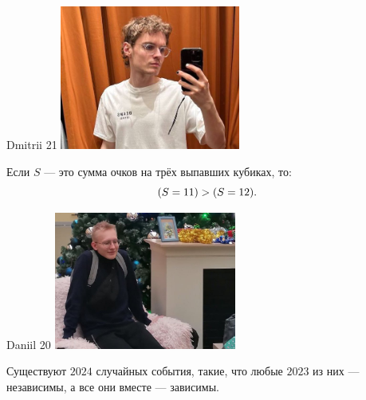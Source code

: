 \documentclass[12pt]{article}
\let\P\relax
\DeclareMathOperator{\P}{\mathbb{P}}
\begin{document}
\begin{minipage}{0.45\textwidth}
\begin{tinderm}{Dmitrii 21}
\includegraphics[width=\textwidth]{tinder-photo/dmitrii.png}
  
\begin{mybox}
Если $S$ — это сумма очков на трёх выпавших кубиках, то:
\[
\P(S = 11) > \P(S = 12).
\]
\end{mybox}
\end{tinderm}
\end{minipage}
%
%
\begin{minipage}{0.45\textwidth}
\begin{tinderm}{Daniil 20}
\includegraphics[width=\textwidth]{tinder-photo/daniil.png}

  

\begin{mybox}
Существуют $2024$ случайных события, такие, что любые $2023$ из них — независимы, а все они вместе — зависимы.
\end{mybox}
\end{tinderm}
\end{minipage}
\end{document}
